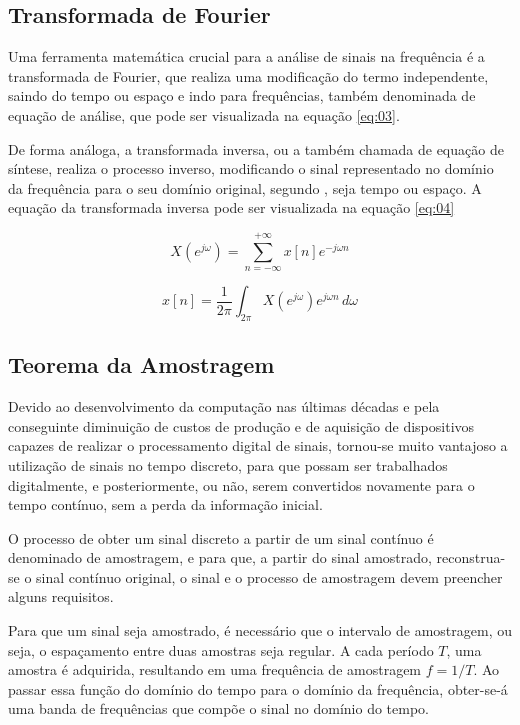 \subsection{Transformada de Fourier}
Uma ferramenta matemática crucial para a análise de sinais na frequência é a transformada de Fourier, que realiza uma modificação do termo independente, saindo do tempo ou espaço e indo para frequências, também denominada de equação de análise, que pode ser visualizada na equação \ref{eq:03}. \par De forma análoga, a transformada inversa, ou a também chamada de equação de síntese, realiza o processo inverso, modificando o sinal representado no domínio da frequência para o seu domínio original, segundo \cite{oppenheim2010sinais}, seja tempo ou espaço. A equação da transformada inversa pode ser visualizada na equação \ref{eq:04}

\begin{equation}  \label{eq:03}
X(e^{j\omega})= \sum_{n=-\infty}^{+\infty} x[n]e^{-j\omega n}
\end{equation}

\begin{equation}  \label{eq:04}
x[n]=\frac{1}{2\pi} \int_{2\pi}^{} X(e^{j\omega})e^{j\omega n} \,d\omega
\end{equation}

\subsection{Teorema da Amostragem}
Devido ao desenvolvimento da computação nas últimas décadas e pela conseguinte diminuição de custos de produção e de aquisição de dispositivos capazes de realizar o processamento digital de sinais, tornou-se muito vantajoso a utilização de sinais no tempo discreto, para que possam ser trabalhados digitalmente, e posteriormente, ou não, serem convertidos novamente para o tempo contínuo, sem a perda da informação inicial. 

O processo de obter um sinal discreto a partir de um sinal contínuo é denominado de amostragem, e para que, a partir do sinal amostrado, reconstrua-se o sinal contínuo original, o sinal e o processo de amostragem devem preencher alguns requisitos.

Para que um sinal seja amostrado, é necessário que o intervalo de amostragem, ou seja, o espaçamento entre duas amostras seja regular. A cada período $T$, uma amostra é adquirida, resultando em uma frequência de amostragem $f = 1/T$. Ao passar essa função do domínio do tempo para o domínio da frequência, obter-se-á uma banda de frequências que compõe o sinal no domínio do tempo.

